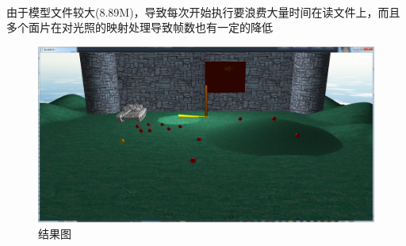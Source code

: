 \documentclass{article}
\begin{document}
        \paragraph{}
            由于模型文件较大(8.89M)，导致每次开始执行要浪费大量时间在读文件上，而且多个面片在对光照的映射处理导致帧数也有一定的降低
            \begin{figure}[bhtp]
                    \begin{minipage}[bhtp!]{1\linewidth}\centering
                    \includegraphics[width=12cm]{result.png}
                    \caption{结果图}\label{2-a}
                    \end{minipage}
                \end{figure}
\end{document}
